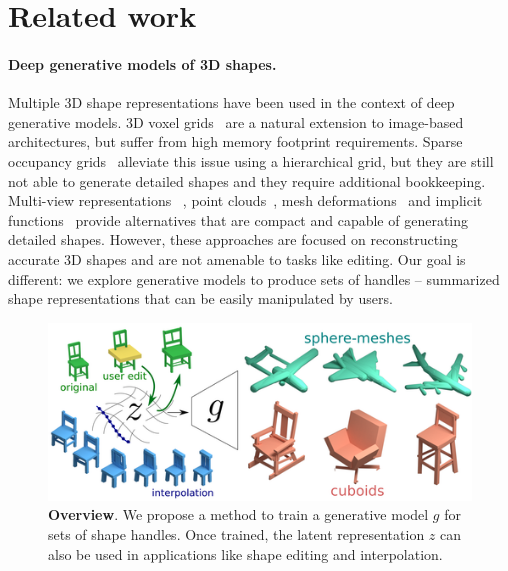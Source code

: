 \section{Related work}
\label{sec:related}

\paragraph*{Deep generative models of 3D shapes.}
Multiple 3D shape representations have been used in the context of
deep generative models.
3D voxel grids~\cite{choy20163d, prgan} are a natural extension to image-based architectures,
but suffer from high memory footprint requirements.
Sparse occupancy grids~\cite{Wang-2017-ocnn, tatarchenko2017octree, hie3dcnn, matryoshka} alleviate this issue using a hierarchical grid,
but they are still not able to generate detailed shapes and they require additional bookkeeping.
Multi-view representations ~\cite{Soltani17, LunGKMW17}, point clouds~\cite{fan2016point, mrt18, pcagan, latentpc}, mesh deformations~\cite{pixel2mesh, cmrKanazawa18}
and implicit functions~\cite{park2019deepsdf, mescheder2019occupancy, chen2019learning, genova2019learning} provide alternatives that are compact and capable
of generating detailed shapes.
However, these approaches are focused on reconstructing accurate 3D shapes and
are not amenable to tasks like editing.
Our goal is different: we explore generative models to produce sets of handles --
summarized shape representations that can be easily manipulated by users.

\begin{figure}
\centering
\includegraphics[width=0.8\linewidth]{handles/imgs/pipeline.png}
\caption{\label{fig:handles}
\textbf{Overview}.
We propose a method to train a generative model $g$ for sets of shape handles.
Once trained, the latent representation $z$ can also be used in applications like
shape editing and interpolation.}
\vspace{-14pt}
\end{figure}


